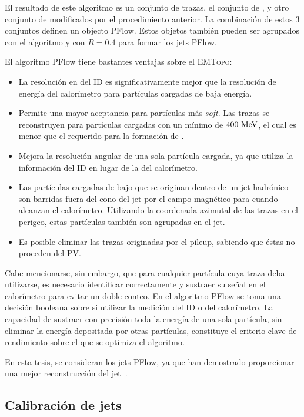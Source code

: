 El resultado de este algoritmo es un conjunto de trazas, el conjunto de \topos, y otro conjunto de \topos modificados por el procedimiento anterior. La combinaci\'on de estos 3 conjuntos definen un objecto \ac{PFlow}. Estos objetos también pueden ser agrupados con el algoritmo \antikt y con \(R=0.4\) para formar los jets \ac{PFlow}.

El algoritmo \ac{PFlow} tiene bastantes ventajas sobre el \textsc{EMTopo}:
\begin{itemize}
    \item La resolución en \pt del \ac{ID} es significativamente mejor que la resolución de energía del calorímetro para partículas cargadas de baja energía.
    \item Permite una mayor aceptancia para partículas más \textit{soft}. Las trazas se reconstruyen para partículas cargadas con un mínimo \pt de \(400~\text{MeV}\), el cual es menor que el requerido para la formaci\'on de \topos.
    \item Mejora la resolución angular de una sola partícula cargada, ya que utiliza la información del \ac{ID} en lugar de la del calorímetro.
    \item Las partículas cargadas de bajo \pt que se originan dentro de un jet hadrónico son barridas fuera del cono del jet por el campo magnético para cuando alcanzan el calorímetro. Utilizando la coordenada azimutal de las trazas en el perigeo, estas partículas tambi\'en son agrupadas en el jet.
    \item Es posible eliminar las trazas originadas por el pileup, sabiendo que éstas no proceden del \ac{PV}.
\end{itemize}

Cabe mencionarse, sin embargo, que para cualquier partícula cuya traza deba utilizarse, es necesario identificar correctamente y sustraer su señal en el calorímetro para evitar un doble conteo. En el algoritmo \ac{PFlow} se toma una decisión booleana sobre si utilizar la medición del \ac{ID} o del calorímetro. La capacidad de sustraer con precisión toda la energía de una sola partícula, sin eliminar la energía depositada por otras partículas, constituye el criterio clave de rendimiento sobre el que se optimiza el algoritmo.

En esta tesis, se consideran los jets \ac{PFlow}, ya que han demostrado proporcionar una mejor reconstrucción del jet~\cite{ATLAS-JetPFlow-Performance}.


\subsection{Calibraci\'on de jets}

